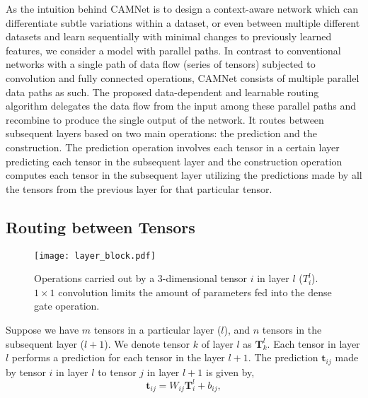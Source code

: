 \documentclass[10pt,twocolumn,letterpaper]{article}
\begin{document}
As the intuition behind CAMNet is to design a context-aware network which can differentiate subtle variations within a dataset, or even between multiple different datasets and learn sequentially with minimal changes to previously learned features, we consider a model with parallel paths. In contrast to conventional networks with a single path of data flow (series of tensors) subjected to convolution and fully connected operations, CAMNet consists of multiple parallel data paths as such. The proposed data-dependent and learnable routing algorithm delegates the data flow from the input among these parallel paths and recombine to produce the single output of the network. It routes between subsequent layers based on two main operations: the prediction and the construction. The prediction operation involves each tensor in a certain layer predicting each tensor in the subsequent layer and the construction operation computes each tensor in the subsequent layer utilizing the predictions made by all the tensors from the previous layer for that particular tensor.


\subsection{Routing between Tensors}
\label{ss:_sa_routing}
\vspace{-0.05in}

\begin{figure}[t]
	\begin{center}
		\texttt{[image: layer\_block.pdf]}
	\end{center}
	\vspace{-0.2in}
	\caption{Operations carried out by a 3-dimensional tensor $i$ in layer $l$ ($T^{l}_{i}$). $1\times1$ convolution limits the amount of parameters fed into the dense gate operation.}
	\label{fig:block}
	\vspace{-0.1in}
\end{figure}

Suppose we have $m$ tensors in a particular layer ($l$), and $n$ tensors in the subsequent layer ($l+1$). We denote tensor $k$ of layer $l$ as $\boldsymbol{T}^{l}_{k}$. 
Each tensor in layer $l$ performs a prediction for each tensor in the layer $l+1$. The prediction $\boldsymbol{t}_{ij}$ made by tensor $i$ in layer $l$ to tensor $j$ in layer $l+1$ is given by, 
\vspace{-0.1in}
\begin{equation}
\boldsymbol{t}_{ij} = W_{ij}\boldsymbol{T}^l_{i} + b_{ij},
\end{equation} 
\end{document}
